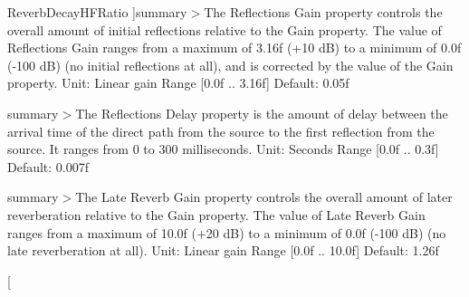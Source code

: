 \begin{Desc}
\begin{description}
{\hypertarget{namespace_open_t_k_1_1_audio_1_1_open_a_l_aa0356299908369b4365d28572c0ec20ba46ed64e6d4618ef7bc5b0deb3aa7a069}{Reverb\-Decay\-H\-F\-Ratio}\label{namespace_open_t_k_1_1_audio_1_1_open_a_l_aa0356299908369b4365d28572c0ec20ba46ed64e6d4618ef7bc5b0deb3aa7a069}
}]summary$>$The Reflections Gain property controls the overall amount of initial reflections relative to the Gain property. The value of Reflections Gain ranges from a maximum of 3.\-16f (+10 d\-B) to a minimum of 0.\-0f (-\/100 d\-B) (no initial reflections at all), and is corrected by the value of the Gain property. Unit\-: Linear gain Range \mbox{[}0.\-0f .. 3.\-16f\mbox{]} Default\-: 0.\-05f\item[{\em 
\hypertarget{namespace_open_t_k_1_1_audio_1_1_open_a_l_aa0356299908369b4365d28572c0ec20ba3c5c7b5f71e753e7636feafce322c501}{Reverb\-Reflections\-Gain}\label{namespace_open_t_k_1_1_audio_1_1_open_a_l_aa0356299908369b4365d28572c0ec20ba3c5c7b5f71e753e7636feafce322c501}
}]summary$>$The Reflections Delay property is the amount of delay between the arrival time of the direct path from the source to the first reflection from the source. It ranges from 0 to 300 milliseconds. Unit\-: Seconds Range \mbox{[}0.\-0f .. 0.\-3f\mbox{]} Default\-: 0.\-007f\item[{\em 
\hypertarget{namespace_open_t_k_1_1_audio_1_1_open_a_l_aa0356299908369b4365d28572c0ec20ba03b4844f8cb77a721e1adeb72c66e64c}{Reverb\-Reflections\-Delay}\label{namespace_open_t_k_1_1_audio_1_1_open_a_l_aa0356299908369b4365d28572c0ec20ba03b4844f8cb77a721e1adeb72c66e64c}
}]summary$>$The Late Reverb Gain property controls the overall amount of later reverberation relative to the Gain property. The value of Late Reverb Gain ranges from a maximum of 10.\-0f (+20 d\-B) to a minimum of 0.\-0f (-\/100 d\-B) (no late reverberation at all). Unit\-: Linear gain Range \mbox{[}0.\-0f .. 10.\-0f\mbox{]} Default\-: 1.\-26f\item[{\em 
}
\end{description}
\end{Desc}
